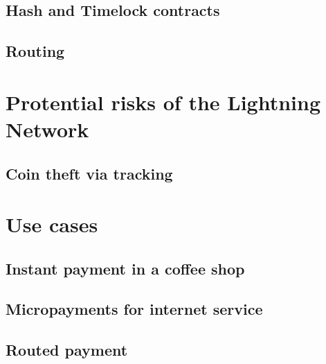 \documentclass[a4paper, 12pt]{report}
\begin{document}
\section{Hash and Timelock contracts}
\section{Routing}

\chapter{Protential risks of the Lightning Network}
\section{Coin theft via tracking}

\chapter{Use cases}
\section{Instant payment in a coffee shop}
\section{Micropayments for internet service}
\section{Routed payment}
\end{document}
